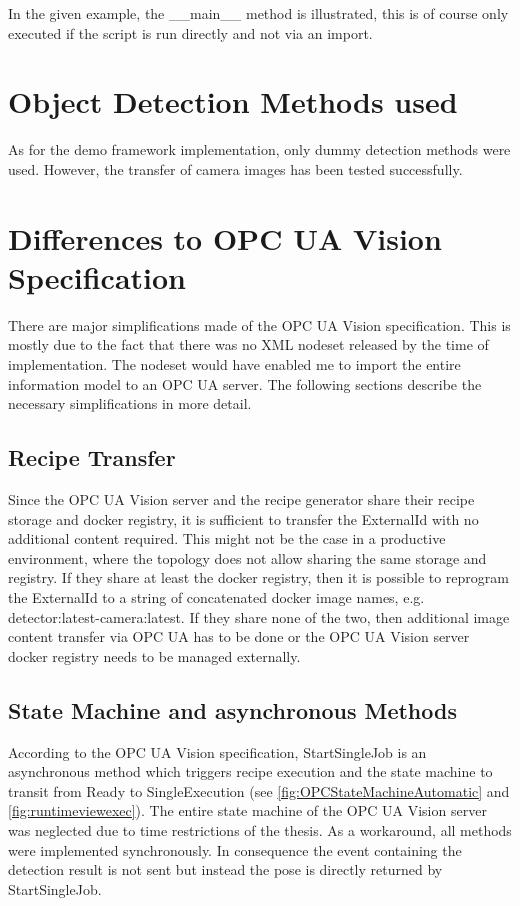 In the given example, the \_\_main\_\_ method is illustrated, this is of course only executed if the script is run directly and not via an import.

\section{Object Detection Methods used}
As for the demo framework implementation, only dummy detection methods were used. However, the transfer of camera images has been tested successfully.

\section{Differences to OPC UA Vision Specification}
There are major simplifications made of the OPC UA Vision specification. This is mostly due to the fact that there was no XML nodeset released by the time of implementation. The nodeset would have enabled me to import the entire information model to an OPC UA server. The following sections describe the necessary simplifications in more detail.

\subsection{Recipe Transfer}
Since the OPC UA Vision server and the recipe generator share their recipe storage and docker registry, it is sufficient to transfer the ExternalId with no additional content required. This might not be the case in a productive environment, where the topology does not allow sharing the same storage and registry. If they share at least the docker registry, then it is possible to reprogram the ExternalId to a string of concatenated docker image names, e.g. detector:latest-camera:latest. If they share none of the two, then additional image content transfer via OPC UA has to be done or the OPC UA Vision server docker registry needs to be managed externally.

\subsection{State Machine and asynchronous Methods}
According to the OPC UA Vision specification, StartSingleJob is an asynchronous method which triggers recipe execution and the state machine to transit from Ready to SingleExecution (see \ref{fig:OPCStateMachineAutomatic} and \ref{fig:runtimeviewexec}). The entire state machine of the OPC UA Vision server was neglected due to time restrictions of the thesis. As a workaround, all methods were implemented synchronously. In consequence the event containing the detection result is not sent but instead the pose is directly returned by StartSingleJob.


